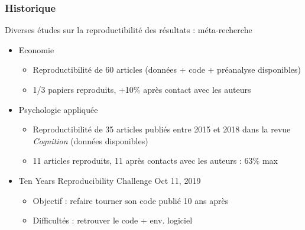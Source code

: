 \begin{frame}
\frametitle{Historique}
\vspace{-0.4cm}
\begin{block}{Diverses études sur la reproductibilité des résultats : méta-recherche}
\footnotesize
\begin{itemize}
\footnotesize  
\item Economie
  \begin{itemize}
   \footnotesize 
  \item Reproductibilité de 60 articles (données + code + préanalyse disponibles)
  \item 1/3 papiers reproduits, +10$\%$ après contact avec les auteurs
  \end{itemize}
  \footnotesize
  \vspace{-0.3cm}
\item Psychologie appliquée
  \begin{itemize}
    \footnotesize
  \item Reproductibilité de 35 articles publiés entre 2015 et 2018 dans la revue \textit{Cognition} (données disponibles)
  \item 11 articles reproduits, 11 après contacts avec les auteurs : 63$\%$ max \\
  \end{itemize}
  \footnotesize
  \vspace{-0.3cm}
\item Ten Years Reproducibility Challenge Oct 11, 2019
  \begin{itemize}
   \footnotesize 
  \item Objectif : refaire tourner son code publié 10 ans après 
  \item Difficultés : retrouver le code + env. logiciel \\
  \end{itemize}  
\end{itemize}
\end{block}
\end{frame}






